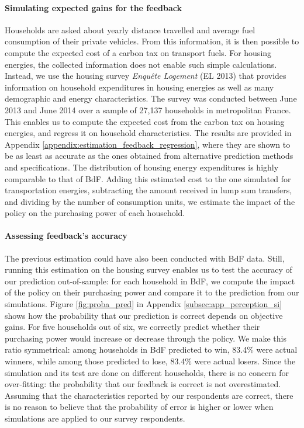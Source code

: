 \documentclass[12pt]{article} %
\begin{document}
\paragraph{Simulating expected gains for the feedback}
Households are asked about yearly distance travelled and average fuel consumption of their private vehicles. From this information, it is then possible to compute the expected cost of a carbon tax on transport fuels. For housing energies, the collected information does not enable such simple calculations. Instead, we use the housing survey \emph{Enquête Logement} (EL 2013) that provides information on household expenditures in housing energies as well as many demographic and energy characteristics. The survey was conducted between June 2013 and June 2014 over a sample of 27,137 households in metropolitan France. This enables us to compute the expected cost from the carbon tax on housing energies, and regress it on household characteristics. The results are provided in Appendix \ref{appendix:estimation_feedback_regression}, where they are shown to be as least as accurate as the ones obtained from alternative prediction methods and specifications. The distribution of housing energy expenditures is highly comparable to that of BdF. Adding this estimated cost to the one simulated for transportation energies, subtracting the amount received in lump sum transfers, and dividing by the number of consumption units, we estimate the impact of the policy on the purchasing power of each household.

\paragraph{Assessing feedback's accuracy}
The previous estimation could have also been conducted with BdF data. Still, running this estimation on the housing survey enables us to test the accuracy of our prediction out-of-sample: for each household in BdF, we compute the impact of the policy on their purchasing power and compare it to the prediction from our simulations. Figure \ref{fig:proba_pred} in Appendix \ref{subsec:app_perception_si} shows how the probability that our prediction is correct depends on objective gains. For five households out of six, we correctly predict whether their purchasing power would increase or decrease through the policy. We make this ratio symmetrical: among households in BdF predicted to win, 83.4\% were actual winners, while among those predicted to lose, 83.4\% were actual losers. Since the simulation and its test are done on different households, there is no concern for over-fitting: the probability that our feedback is correct is not overestimated. Assuming that the characteristics reported by our respondents are correct, there is no reason to believe that the probability of error is higher or lower when simulations are applied to our survey respondents.
\end{document}
